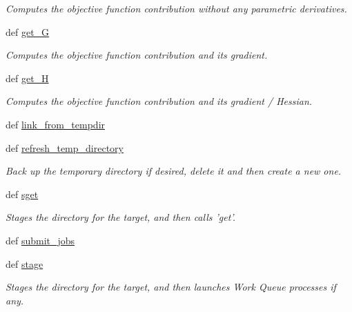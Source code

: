 \begin{DoxyCompactItemize}
\begin{DoxyCompactList}\small\item\em \-Computes the objective function contribution without any parametric derivatives. \end{DoxyCompactList}\item 
def \hyperlink{classforcebalance_1_1target_1_1Target_afa8cc38c8bba8861c072e789717aa049}{get\-\_\-\-G}
\begin{DoxyCompactList}\small\item\em \-Computes the objective function contribution and its gradient. \end{DoxyCompactList}\item 
def \hyperlink{classforcebalance_1_1target_1_1Target_a1d2ee27fe86a09769c1816af23b09adb}{get\-\_\-\-H}
\begin{DoxyCompactList}\small\item\em \-Computes the objective function contribution and its gradient / \-Hessian. \end{DoxyCompactList}\item 
def \hyperlink{classforcebalance_1_1target_1_1Target_a5aa4958cea0a48138511567a076c5a82}{link\-\_\-from\-\_\-tempdir}
\item 
def \hyperlink{classforcebalance_1_1target_1_1Target_afe815eafab06ac92f10bbf4b88ad95c8}{refresh\-\_\-temp\-\_\-directory}
\begin{DoxyCompactList}\small\item\em \-Back up the temporary directory if desired, delete it and then create a new one. \end{DoxyCompactList}\item 
def \hyperlink{classforcebalance_1_1target_1_1Target_a51d58b55242bf4d4909c1837174f5f3c}{sget}
\begin{DoxyCompactList}\small\item\em \-Stages the directory for the target, and then calls 'get'. \end{DoxyCompactList}\item 
def \hyperlink{classforcebalance_1_1target_1_1Target_a78cd29b94cbcc201eed99c78aaef46a4}{submit\-\_\-jobs}
\item 
def \hyperlink{classforcebalance_1_1target_1_1Target_af8d2a4658c87841e40296795aec478bb}{stage}
\begin{DoxyCompactList}\small\item\em \-Stages the directory for the target, and then launches \-Work \-Queue processes if any. \end{DoxyCompactList}\item 

\end{DoxyCompactItemize}
